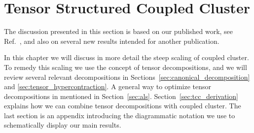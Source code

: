 \chapter{Tensor Structured Coupled Cluster
\label{ch:tcc}} 
The discussion presented in this section is based on our published work, see 
Ref.~\cite{schutski2017tensor}, and also on several new results intended for 
another publication.

In this chapter we will discuss in more detail the steep scaling of coupled 
cluster. To remedy this scaling we use the concept of tensor decompositions, and 
we will review several relevant decompositions 
in Sections~\ref{sec:canonical_decomposition} and 
\ref{sec:tensor_hypercontraction}. A general way to optimize tensor 
decompositions in mentioned in Section~\ref{sec:als}. 
Section~\ref{sec:tcc_derivation} explains how we can combine tensor 
decompositions with coupled cluster. The last section is an 
appendix introducing the diagrammatic notation we use to schematically display 
our main results.

